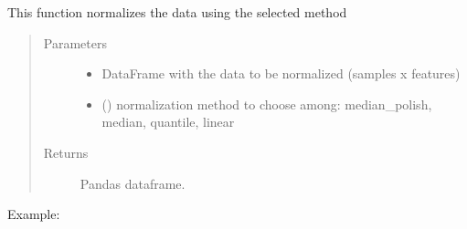 \documentclass[letterpaper,10pt,english]{sphinxmanual}
\begin{document}
\begin{fulllineitems}
\label{\detokenize{_autosummary/analytics_core.analytics:analytics_core.analytics.analytics.normalize_data}}
This function normalizes the data using the selected method
\begin{quote}\begin{description}
\item[{Parameters}] \leavevmode\begin{itemize}
\item {} 
 \textendash{} DataFrame with the data to be normalized (samples x features)

\item {} 
 () \textendash{} normalization method to choose among: median\_polish, median,
quantile, linear

\end{itemize}

\item[{Returns}] \leavevmode
Pandas dataframe.

\end{description}\end{quote}

Example:

\begin{sphinxVerbatim}[commandchars=\\\{\}]
   
\end{sphinxVerbatim}

\end{fulllineitems}

\end{document}
